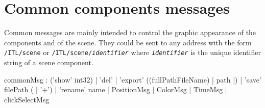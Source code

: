 \documentclass[a4paper,twoside]{report}
\newcommand{\toplevel}[1]	{\chapter{#1}}
\newcommand{\OSC}[1]		{\texttt{#1}}
\begin{document}
\toplevel{Common components messages}
\label{common}
Common messages are mainly intended to control the graphic appearance of the components and  of the scene.
They could be sent to any address with the form \OSC{/ITL/scene} or \OSC{/ITL/scene/\textit{identifier}} where \OSC{\textit{identifier}} is the unique identifier string of a scene component.
\begin{rail}
commonMsg :  ('show' int32)
			| 'del'
			| 'export' ((fullPathFileName) | path |)
			| 'save' filePath ( | '+')
			| 'rename' name
			| PositionMsg
			| ColorMsg
			| TimeMsg
			| clickSelectMsg
\end{rail}
\end{document}

